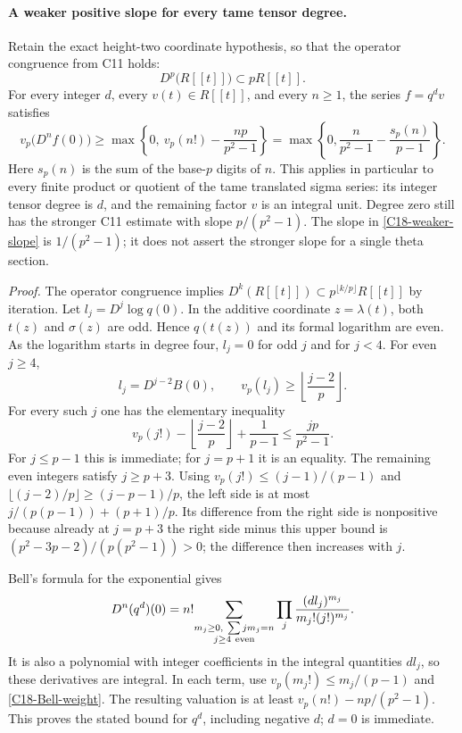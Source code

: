 \paragraph{A weaker positive slope for every tame tensor degree.}
Retain the exact height-two coordinate hypothesis, so that the
operator congruence from C11 holds:
\[
 D^p\bigl(R[[t]]\bigr)\subset pR[[t]].
\]
For every integer $d$, every $v(t)\in R[[t]]$, and every $n\geq1$,
the series $f=q^dv$ satisfies
\begin{equation}\label{C18-weaker-slope}
 v_p\bigl(D^nf(0)\bigr)
 \geq\max\left\{0,\ v_p(n!)-\frac{np}{p^2-1}\right\}
 =\max\left\{0,\frac{n}{p^2-1}
                         -\frac{s_p(n)}{p-1}\right\}.
\end{equation}
Here $s_p(n)$ is the sum of the base-$p$ digits of $n$.
This applies in particular to every finite product or quotient of the
tame translated sigma series: its integer tensor degree is $d$, and
the remaining factor $v$ is an integral unit.  Degree zero still has
the stronger C11 estimate with slope $p/(p^2-1)$.
The slope in \eqref{C18-weaker-slope} is $1/(p^2-1)$; it does not assert
the stronger slope for a single theta section.

\emph{Proof.}
The operator congruence implies
$D^k(R[[t]])\subset p^{\lfloor k/p\rfloor}R[[t]]$ by iteration.
Let $l_j=D^j\log q(0)$.  In the additive coordinate $z=\lambda(t)$,
both $t(z)$ and $\sigma(z)$ are odd.  Hence $q(t(z))$ and its formal
logarithm are even.  As the logarithm starts in degree four,
$l_j=0$ for odd $j$ and for $j<4$.  For even $j\geq4$,
\[
 l_j=D^{j-2}B(0),\qquad
 v_p(l_j)\geq\left\lfloor\frac{j-2}{p}\right\rfloor.
\]
For every such $j$ one has the elementary inequality
\begin{equation}\label{C18-Bell-weight}
 v_p(j!)-\left\lfloor\frac{j-2}{p}\right\rfloor
          +\frac1{p-1}\leq\frac{jp}{p^2-1}.
\end{equation}
For $j\leq p-1$ this is immediate; for $j=p+1$ it is an equality.
The remaining even integers satisfy $j\geq p+3$.  Using
$v_p(j!)\leq(j-1)/(p-1)$ and
$\lfloor(j-2)/p\rfloor\geq(j-p-1)/p$, the left side is at most
$j/(p(p-1))+(p+1)/p$.  Its difference from the right side is
nonpositive because already at $j=p+3$ the right side minus this
upper bound is
$(p^2-3p-2)/(p(p^2-1))>0$; the difference then increases with $j$.

Bell's formula for the exponential gives
\[
 D^n(q^d)(0)=
 n!\!\sum_{\substack{m_j\geq0,\ \sum jm_j=n\\j\geq4\ {\rm even}}}
       \prod_j\frac{(d l_j)^{m_j}}{m_j!(j!)^{m_j}}.
\]
It is also a polynomial with integer coefficients in the integral
quantities $d l_j$, so these derivatives are integral.  In each term,
use $v_p(m_j!)\leq m_j/(p-1)$ and
\eqref{C18-Bell-weight}.  The resulting valuation is at least
$v_p(n!)-np/(p^2-1)$.  This proves the stated bound for $q^d$,
including negative $d$; $d=0$ is immediate.

